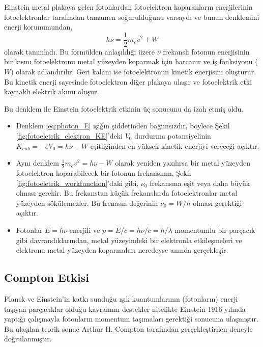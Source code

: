 \documentclass[a4paper,12pt, twoside]{article}
\begin{document}
Einstein metal plakaya gelen fotonlardan fotoelektron koparanların enerjilerinin fotoelektronlar tarafından tamamen soğurulduğunu varsaydı ve bunun denklemini enerji korunumundan,
\begin{equation}
\label{eq:photon_E}
h\nu = \frac{1}{2}m_e v^2 + W
\end{equation}
olarak tanımladı. Bu formülden anlaşıldığı üzere $\nu$ frekanslı fotonun enerjisinin bir kısmı fotoelektronu metal yüzeyden koparmak için harcanır ve iş fonksiyonu ($W$) olarak adlandırılır. Geri kalanı ise fotoelektronun kinetik enerjisini oluşturur. Bu kinetik enerji sayesinde fotoelektron diğer plakaya ulaşır ve fotoelektrik etki kaynaklı elektrik akımı oluşur.

Bu denklem ile Einstein fotoelektrik etkinin üç sonucunu da izah etmiş oldu.

\begin{itemize}
\item Denklem \ref{eq:photon_E} ışığın şiddetinden bağımsızdır, böylece Şekil \ref{fig:fotoeletrik_elektron_KE}'deki $V_0$ durdurma potansiyelinin $K_{enb}=-eV_0=h\nu - W$ eşitliğinden en yüksek kinetik enerjiyi vereceği açıktır.

\item Aynı denklem $\frac{1}{2}m_e v^2 = h\nu - W$ olarak yeniden yazılırsa bir metal yüzeyden fotoelektron koparabilecek bir fotonun frekansının, Şekil \ref{fig:fotoeletrik_workfunction}'daki gibi, $\nu_0$ frekansına eşit veya daha büyük olması gerekir. Bu frekanstan küçük frekanslarda fotoelektronlar metal yüzeyden sökülemezler. Bu frenasın değerinin $\nu_0 = W/h$ olması gerektiği açıktır.

\item Fotonlar $E=h\nu$ enerjili ve  $p= E/c = h\nu/c = h/\lambda$ momentumlu bir parçacık gibi davrandıklarından, metal yüzeyindeki bir elektronla etkileşmeleri ve elektronu metal yüzeyden koparmaları neredeyse anında gerçekleşir. 
\end{itemize}

\subsection{Compton Etkisi}
Planck ve Einstein'in katkı sunduğu ışık kuantumlarının (fotonların) enerji taşıyan parçacıklar olduğu kavramını destekler nitelikte Einstein 1916 yılında yaptığı çalışmayla fotonların momentum taşımaları gerektiği sonucuna ulaşmıştır. Bu ulaşılan teorik sonuc Arthur H. Compton tarafından gerçekleştirilen deneyle doğrulanmıştır.
\end{document}
